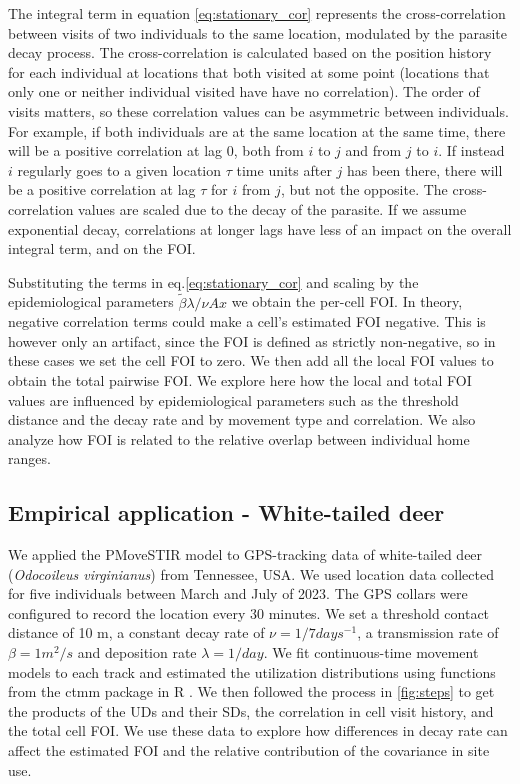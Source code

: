 \documentclass[letterpaper]{article}
\begin{document}
The integral term in equation \ref{eq:stationary_cor} represents the cross-correlation between visits of two individuals to the same location, modulated by the parasite decay process. 
The cross-correlation is calculated based on the position history for each individual at locations that both visited at some point (locations that only one or neither individual visited have have no correlation). %
The order of visits matters, so these correlation values can be asymmetric between individuals. 
For example, if both individuals are at the same location at the same time, there will be a positive correlation at lag 0, both from $i$ to $j$ and from $j$ to $i$. If instead $i$ regularly goes to a given location $\tau$ time units after $j$ has been there, there will be a positive correlation at lag $\tau$ for $i$ from $j$, but not the opposite. The cross-correlation values are scaled due to the decay of the parasite. If we assume exponential decay, correlations at longer lags have less of an impact on the overall integral term, and on the FOI.

Substituting the terms in eq.\ref{eq:stationary_cor} and scaling by the epidemiological parameters $\tilde\beta\lambda/\nu Ax$ we obtain the per-cell FOI. 
In theory, negative correlation terms could make a cell's estimated FOI negative. This is however only an artifact, since the FOI is defined as strictly non-negative, so in these cases we set the cell FOI to zero.%
 We then add all the local FOI values to obtain the total pairwise FOI.
We explore here how the local and total FOI values are influenced by epidemiological parameters such as the threshold distance and the decay rate and by movement type and correlation. We also analyze how FOI is related to the relative overlap between individual home ranges.

\subsection*{Empirical application - White-tailed deer}

We applied the PMoveSTIR model to GPS-tracking data of white-tailed deer (\emph{Odocoileus virginianus}) from Tennessee, USA.
We used location data collected for five individuals between March and July of 2023. The GPS collars were configured to record the location every 30 minutes.
We set a threshold contact distance of 10 m, a constant decay rate of $\nu=1/7 days^{-1}$, a transmission rate of $\beta=1 m^2/s$ and deposition rate $\lambda=1/day$.
We fit continuous-time movement models to each track and estimated the utilization distributions using functions from the ctmm package in R \citep{Calabrese2016}. 
We then followed the process in \ref{fig:steps} to get the products of the UDs and their SDs, the correlation in cell visit history, and the total cell FOI.
We use these data to explore how differences in decay rate can affect the estimated FOI and the relative contribution of the covariance in site use. 
\end{document}
